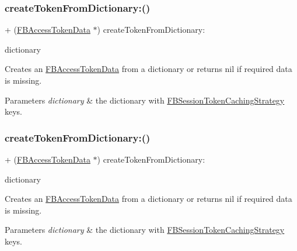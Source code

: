 \subsubsection{\texorpdfstring{create\+Token\+From\+Dictionary\+:()}{createTokenFromDictionary:()}\hspace{0.1cm}{\footnotesize\ttfamily [2/5]}}
{\footnotesize\ttfamily + (\hyperlink{interfaceFBAccessTokenData}{F\+B\+Access\+Token\+Data} $\ast$) create\+Token\+From\+Dictionary\+: \begin{DoxyParamCaption}\item[{(N\+S\+Dictionary $\ast$)}]{dictionary }\end{DoxyParamCaption}}

Creates an \hyperlink{interfaceFBAccessTokenData}{F\+B\+Access\+Token\+Data} from a dictionary or returns nil if required data is missing. 
\begin{DoxyParams}{Parameters}
{\em dictionary} & the dictionary with \hyperlink{interfaceFBSessionTokenCachingStrategy}{F\+B\+Session\+Token\+Caching\+Strategy} keys. \\
\hline
\end{DoxyParams}
\mbox{\label{interfaceFBAccessTokenData_a0a756bdb60ce1b81cd4dbc61943315a9}} 
\subsubsection{\texorpdfstring{create\+Token\+From\+Dictionary\+:()}{createTokenFromDictionary:()}\hspace{0.1cm}{\footnotesize\ttfamily [3/5]}}
{\footnotesize\ttfamily + (\hyperlink{interfaceFBAccessTokenData}{F\+B\+Access\+Token\+Data} $\ast$) create\+Token\+From\+Dictionary\+: \begin{DoxyParamCaption}\item[{(N\+S\+Dictionary $\ast$)}]{dictionary }\end{DoxyParamCaption}}

Creates an \hyperlink{interfaceFBAccessTokenData}{F\+B\+Access\+Token\+Data} from a dictionary or returns nil if required data is missing. 
\begin{DoxyParams}{Parameters}
{\em dictionary} & the dictionary with \hyperlink{interfaceFBSessionTokenCachingStrategy}{F\+B\+Session\+Token\+Caching\+Strategy} keys. \\
\hline
\end{DoxyParams}
\mbox{\label{interfaceFBAccessTokenData_a0a756bdb60ce1b81cd4dbc61943315a9}} 

